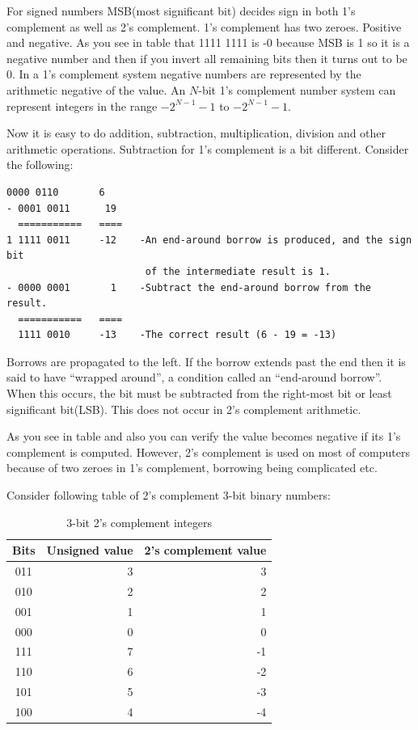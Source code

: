 For signed numbers MSB(most significant bit) decides sign in both 1's
complement as well as 2's complement. 1's complement has two zeroes. Positive
and negative. As you see in table that 1111 1111 is -0 because MSB is 1 so it
is a negative number and then if you invert all remaining bits then it turns
out to be 0. In a 1's complement system negative numbers are represented by the
arithmetic negative of the value. An $N$-bit 1's complement number system can
represent integers in the range $-2^{N-1} - 1$ to $-2^{N-1} - 1$.

Now it is easy to do addition, subtraction, multiplication, division and other
arithmetic operations. Subtraction for 1's complement is a bit
different. Consider the following:

\begin{Verbatim}[frame=single]
  0000 0110       6
- 0001 0011      19
  ===========   ====
1 1111 0011     -12    -An end-around borrow is produced, and the sign bit
                        of the intermediate result is 1.
- 0000 0001       1    -Subtract the end-around borrow from the result.
  ===========   ====
  1111 0010     -13    -The correct result (6 - 19 = -13)
\end{Verbatim}

Borrows are propagated to the left. If the borrow extends past the end then it
is said to have ``wrapped around'', a condition called an ``end-around
borrow''. When this occurs, the bit must be subtracted from the right-most bit
or least significant bit(LSB). This does not occur in 2's complement arithmetic.

As you see in table and also you can verify the value becomes negative if its
1's complement is computed. However, 2's complement is used on most of
computers because of two zeroes in 1's complement, borrowing being complicated
etc. 

Consider following table of 2's complement 3-bit binary numbers:

\begin{table}[H]
  \begin{center}
    \caption{3-bit 2's complement integers}
    \begin{tabular}{|c|r|r|}
      \hline
      \textbf{Bits}&\textbf{Unsigned value}&\textbf{2's complement value}\\
      \hline
      011&3&3\\
      \hline
      010&2&2\\
      \hline
      001&1&1\\
      \hline
      000&0&0\\
      \hline
      111&7&-1\\
      \hline
      110&6&-2\\
      \hline
      101&5&-3\\
      \hline
      100&4&-4\\
      \hline
    \end{tabular}
  \end{center}
\end{table}

